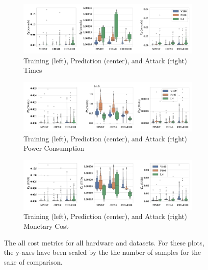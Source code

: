 \documentclass[journal]{IEEEtran}
\begin{document}
\begin{figure}[h]
    \centering
    \begin{subfigure}[b]{.8\textwidth}
        \includegraphics[width=\linewidth,clip]{plots/combined/time.pdf}
        \caption{Training (left), Prediction (center), and Attack (right) Times}
        \label{fig:time}
    \end{subfigure}
    \begin{subfigure}[b]{.8\textwidth}
        \includegraphics[width=\linewidth,clip]{plots/combined/power.pdf}
        \caption{Training (left), Prediction (center), and Attack (right) Power Consumption}
        \label{fig:power}
    \end{subfigure}
    \begin{subfigure}[b]{.8\textwidth}
        \includegraphics[width=\linewidth,clip]{plots/combined/cost.pdf}
        \caption{Training (left), Prediction (center), and Attack (right) Monetary Cost}
        \label{fig:cost}
    \end{subfigure}
    \caption{The all cost metrics for all hardware and datasets. For these plots, the y-axes have been scaled by the the number of samples for the sake of comparison.}
\end{figure}
\end{document}
